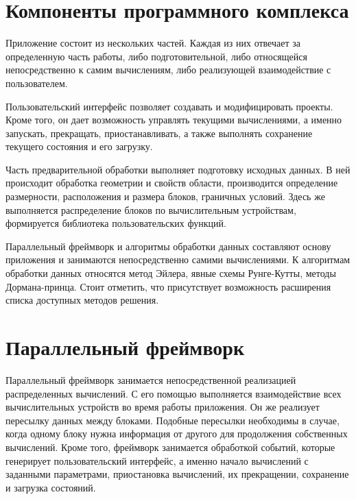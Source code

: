 \documentclass[a4paper, 14pt]{article}
\theoremstyle{definition}
\begin{document}
\newpage
\section{Компоненты программного комплекса}

\par Приложение состоит из нескольких частей. Каждая из них отвечает за определенную часть работы, либо подготовительной, либо относящейся непосредственно к самим вычислениям, либо реализующей взаимодействие с пользователем.

\par Пользовательский интерфейс позволяет создавать и модифицировать проекты. Кроме того, он дает возможность управлять текущими вычислениями, а именно запускать, прекращать, приостанавливать, а также выполнять сохранение текущего состояния и его загрузку.

\par Часть предварительной обработки выполняет подготовку исходных данных. В ней происходит обработка геометрии и свойств области, производится определение размерности, расположения и размера блоков, граничных условий. Здесь же выполняется распределение блоков по вычислительным устройствам, формируется библиотека пользовательских функций.

\par Параллельный фреймворк и алгоритмы обработки данных составляют основу приложения и занимаются непосредственно самими вычислениями. К алгоритмам обработки данных относятся метод Эйлера, явные схемы Рунге-Кутты, методы Дормана-принца. Стоит отметить, что присутствует возможность расширения списка доступных методов решения.

\newpage
\section{Параллельный фреймворк}

\par Параллельный фреймворк занимается непосредственной реализацией распределенных вычислений. С его помощью выполняется взаимодействие всех вычислительных устройств во время работы приложения. Он же реализует пересылку данных между блоками. Подобные пересылки необходимы в случае, когда одному блоку нужна информация от другого для продолжения собственных вычислений. Кроме того, фреймворк занимается обработкой событий, которые генерирует пользовательский интерфейс, а именно начало вычислений с заданными параметрами, приостановка вычислений, их прекращении, сохранение и загрузка состояний.
\end{document}
